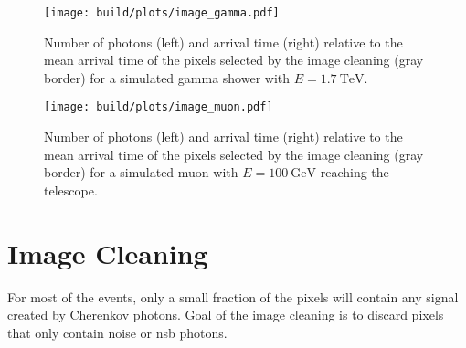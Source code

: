 \begin{figure}
  \centering
  \texttt{[image: build/plots/image\_gamma.pdf]}
  \caption{%
    Number of photons (left) and arrival time (right) relative to the mean arrival time
    of the pixels selected by the image cleaning (gray border) for a simulated 
    gamma shower with $E=\SI{1.7}{\TeV}$.
  }\label{fig:image-gamma}
\end{figure}


\begin{figure}
  \centering
  \texttt{[image: build/plots/image\_muon.pdf]}
  \caption{%
    Number of photons (left) and arrival time (right) relative to the mean arrival time
    of the pixels selected by the image cleaning (gray border) for a simulated 
    muon with $E = \SI{100}{\GeV}$ reaching the telescope.
  }\label{fig:image-muon}
\end{figure}


\section{Image Cleaning}\label{sec:cleaning}
For most of the events, only a small fraction of the pixels will contain any
signal created by Cherenkov photons.
Goal of the image cleaning is to discard pixels that only contain noise or \gls{nsb} photons.

